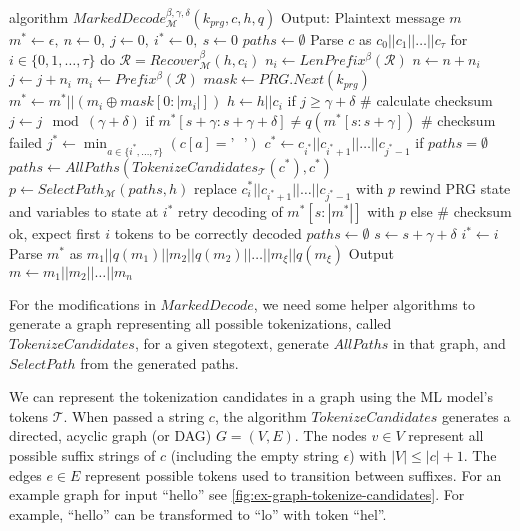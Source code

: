 \begin{Pseudocode}[caption={
$MarkedDecode$ Algorithm.
In comparison to Meteor's $Decode$ algorithm, $MarkedDecode$ checks the checksum every $\gamma$ bits. 
If the checksum does not match, a decoding error happened.
We then perform a lookbehind on the stegotext and generate all possible tokenizations $paths$ for a substring of $c$.
Afterwards, rewind the internal state and retry decoding with a path $p$ selected from $paths$.
}, label={alg:marked-decode}]
algorithm $MarkedDecode_{\mathcal{M}}^{\beta,\gamma,\delta}(k_{prg}, c, h, q)$
	Output: Plaintext message $m$
	$m^* \leftarrow \epsilon,~ n \leftarrow 0,~ j \leftarrow 0,~ i^* \leftarrow 0,~ s \leftarrow 0$
	$paths \leftarrow \emptyset$
	Parse $c$ as $c_0 || c_1 || \dots || c_{\tau}$
	for $i \in \{ 0, 1, \dots, \tau \}$ do
		$\mathcal{R} = Recover_{\mathcal{M}}^\beta(h, c_i)$
		$n_i \leftarrow LenPrefix^\beta(\mathcal{R})$
		$n \leftarrow n + n_i$
		$j \leftarrow j + n_i$
		$m_i \leftarrow Prefix^\beta(\mathcal{R})$
		$mask \leftarrow PRG.Next(k_{prg})$
		$m^* \leftarrow m^* || (m_i \oplus mask[0: |m_i|])$
		$h \leftarrow h||c_i$
		if $j \geq \gamma + \delta$
			# calculate checksum
			$j \leftarrow j \mod (\gamma+\delta)$
			if $m^*[s+\gamma:s+\gamma+\delta] \neq q(m^*[s:s+\gamma])$  # checksum failed
				$j^* \leftarrow \min_{a \in \{ i^*, \dots, \tau \}} (c[a] = \textrm{'~ '})$
				$c^* \leftarrow c_{i^*} || c_{i^*+1} || \dots || c_{j^*-1}$
				if $paths = \emptyset$
					$paths \leftarrow AllPaths(TokenizeCandidates_{\mathcal{T}}(c^*), c^*)$
				$p \leftarrow SelectPath_{\mathcal{M}}(paths, h)$
				replace $c_i^*||c_{i^*+1}||\dots||c_{j^*-1}$ with $p$
				rewind PRG state and variables to state at $i^*$
				retry decoding of $m^*[s:|m^*|]$ with $p$
			else  # checksum ok, expect first $i$ tokens to be correctly decoded
				$paths \leftarrow \emptyset$
				$s \leftarrow s + \gamma + \delta$
				$i^* \leftarrow i$
	Parse $m^*$ as $m_1||q(m_1)||m_2||q(m_2)||\dots||m_\xi||q(m_\xi)$
	Output $m \leftarrow m_1||m_2||\dots||m_n$
\end{Pseudocode}

For the modifications in $MarkedDecode$, we need some helper algorithms to generate a graph representing all possible tokenizations, called $TokenizeCandidates$, for a given stegotext, generate $AllPaths$ in that graph, and $SelectPath$ from the generated paths.

We can represent the tokenization candidates in a graph using the ML model's tokens $\mathcal{T}$.
When passed a string $c$, the algorithm $TokenizeCandidates$ generates a directed, acyclic graph (or DAG) $G = (V, E)$.
The nodes $v \in V$ represent all possible suffix strings of $c$ (including the empty string $\epsilon$) with $|V| \leq |c| + 1$.
The edges $e \in E$ represent possible tokens used to transition between suffixes.
For an example graph for input ``hello'' see \autoref{fig:ex-graph-tokenize-candidates}.
For example, ``hello'' can be transformed to ``lo'' with token ``hel''.

